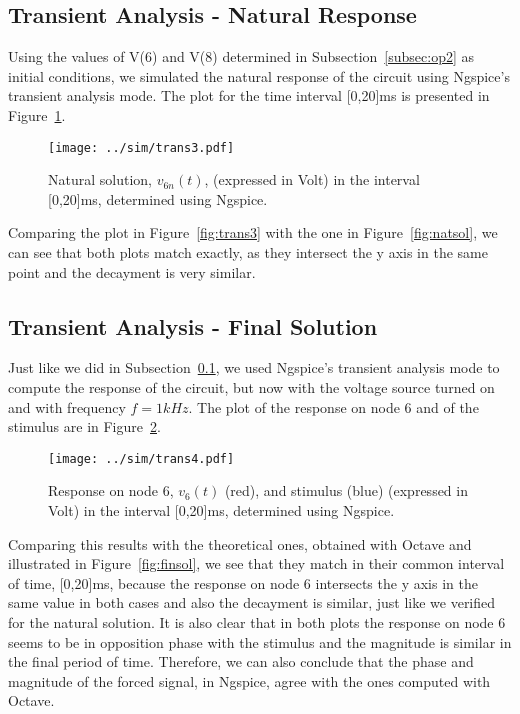 \subsection{Transient Analysis - Natural Response} \label{subsec:trannat}

Using the values of V(6) and V(8) determined in Subsection~\ref{subsec:op2} as initial conditions, we simulated the natural response of the circuit using Ngspice's transient analysis mode. The plot for the time interval [0,20]ms is presented in Figure~\ref{fig:trannat}.

\begin{figure}[H] \centering
\texttt{[image: ../sim/trans3.pdf]}
\caption{Natural solution, $v_{6n}(t)$, (expressed in Volt) in the interval [0,20]ms, determined using Ngspice.}
\label{fig:trannat}
\end{figure}

Comparing the plot in Figure~\ref{fig:trans3} with the one in Figure~\ref{fig:natsol}, we can see that both plots match exactly, as they intersect the y axis in the same point and the decayment is very similar.

\subsection{Transient Analysis - Final Solution} \label{subsec:tranfin}

Just like we did in Subsection~\ref{subsec:trannat}, we used Ngspice's transient analysis mode to compute the response of the circuit, but now with the voltage source turned on and with frequency $f=1kHz$. The plot of the response on node 6 and of the stimulus are in Figure~\ref{fig:trans4}.

\begin{figure}[H] \centering
\texttt{[image: ../sim/trans4.pdf]}
\caption{Response on node 6, $v_{6}(t)$ (red), and stimulus (blue) (expressed in Volt) in the interval [0,20]ms, determined using Ngspice.}
\label{fig:trans4}
\end{figure}

Comparing this results with the theoretical ones, obtained with Octave and illustrated in Figure~\ref{fig:finsol}, we see that they match in their common interval of time, [0,20]ms, because the response on node 6 intersects the y axis in the same value in both cases and also the decayment is similar, just like we verified for the natural solution. It is also clear that in both plots the response on node 6 seems to be in opposition phase with the stimulus and the magnitude is similar in the final period of time. Therefore, we can also conclude that the phase and magnitude of the forced signal, in Ngspice, agree with the ones computed with Octave.

